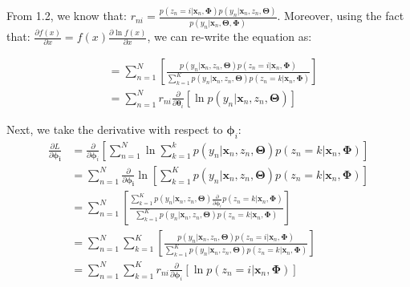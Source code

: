 \documentclass[a4paper]{article}
\begin{document}
From 1.2, we know that: $r_{ni} = \frac{p(z_{n}=i| \pmb{x}_{n}, \pmb{\Phi}) p(y_{n}|\pmb{x}_{n}, z_{n}, \pmb{\Theta})}{p(y_{n}|\pmb{x}_{n}, \pmb{\Theta}, \pmb{\Phi})}$. Moreover, using the fact that: $\frac{\partial f(x)}{\partial x} = f(x)\frac{\partial \ln{f(x)}}{\partial x}$, we can re-write the equation as:

\begin{align*}
    &= \sum_{n=1}^{N} \left[ \frac{ p(y_{n}|\pmb{x}_{n}, z_{n}, \pmb{\Theta}) p(z_{n}=i|\pmb{x}_{n}, \pmb{\Phi})}
    {\sum_{k=1}^{K} p(y_{n}|\pmb{x}_{n}, z_{n}, \pmb{\Theta}) p(z_{n}=k|\pmb{x}_{n}, \pmb{\Phi})}
    \right] \\
    &= \sum_{n=1}^{N} r_{ni} \frac{\partial}{\partial \pmb{\theta}_{i}} \left[ \ln{p(y_{n}|\pmb{x}_{n}, z_{n}, \pmb{\Theta})}\right]
\end{align*}{}

Next, we take the derivative with respect to $\pmb{\phi}_{i}$:
\begin{align*}
    \frac{\partial L}{\partial \pmb{\phi_{i}}} &= \frac{\partial}{\partial \pmb{\phi}_{i}} \left[
    \sum_{n=1}^{N} \ln{\sum_{k=1}^{k} p(y_{n}|\pmb{x}_{n}, z_{n},\pmb{\Theta}) p(z_{n}=k|\pmb{x}_{n}, \pmb{\Phi})}
    \right] \\
    &= \sum_{n=1}^{N} \frac{\partial}{\partial \pmb{\phi_{i}}} \ln \left[{\sum_{k=1}^{K} p(y_{n}|\pmb{x}_{n}, z_{n},\pmb{\Theta}) p(z_{n}=k|\pmb{x}_{n}, \pmb{\Phi}) }\right]\\
    &= \sum_{n=1}^{N} \left[ \frac{\sum_{k=1}^{K} p(y_{n}|\pmb{x}_{n},z_{n}, \pmb{\Theta}) \frac{\partial}{\partial \pmb{\phi}_{i}} p(z_{n}=k|\pmb{x}_{n}, \pmb{\Phi})}
    {\sum_{k=1}^{K} p(y_{n}|\pmb{x}_{n},z_{n}, \pmb{\Theta}) p(z_{n}=k|\pmb{x}_{n}, \pmb{\Phi})}
    \right] \\
    &= \sum_{n=1}^{N} \sum_{k=1}^{K} \left[ \frac{ p(y_{n}|\pmb{x}_{n},z_{n}, \pmb{\Theta})  p(z_{n}=i|\pmb{x}_{n}, \pmb{\Phi})}
    {\sum_{k=1}^{K} p(y_{n}|\pmb{x}_{n},z_{n}, \pmb{\Theta}) p(z_{n}=k|\pmb{x}_{n}, \pmb{\Phi})}
    \right] \\
    &= \sum_{n=1}^{N} \sum_{k=1}^{K} r_{ni}\frac{\partial}{\partial \pmb{\phi}_{i}} \left[\ln{p(z_{n}=i|\pmb{x}_{n},\pmb{\Phi})}\right]
\end{align*}{}
\end{document}

